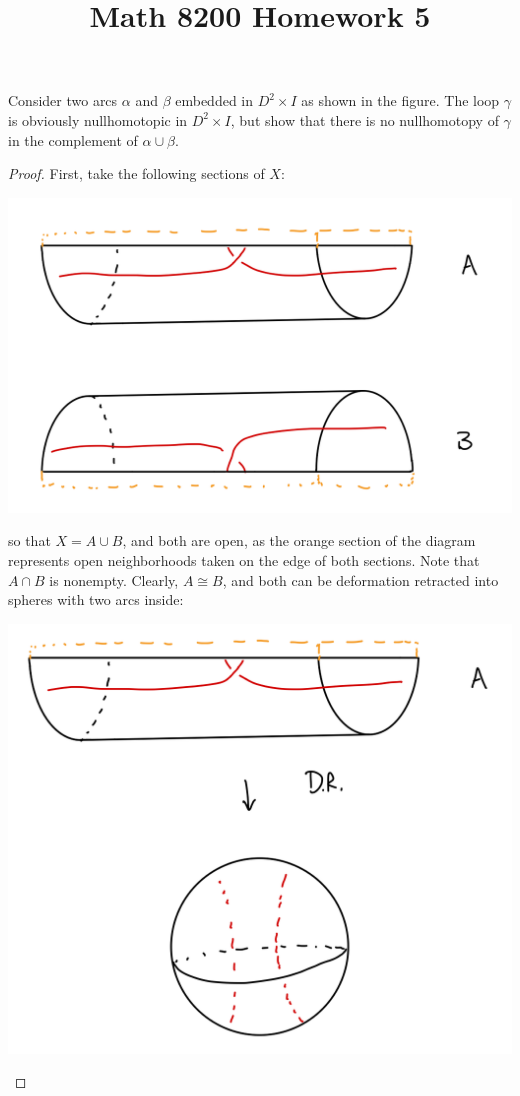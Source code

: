 \documentclass[12pt]{article}
\newenvironment{statement}[2][Statement]{\begin{trivlist}
\item[\hskip \labelsep {\bfseries #1}\hskip \labelsep {\bfseries #2.}]}{\end{trivlist}}
\begin{document}
 
\title{Math 8200 Homework 5} 
\author{} 
\maketitle

\begin{statement}[Problem]{1}
  Consider two arcs $\alpha$ and $\beta$ embedded in $D^2 \times I$ as shown in the figure. 
  The loop $\gamma$ is obviously nullhomotopic in $D^2 \times I$, but show that there is 
  no nullhomotopy of $\gamma$ in the complement of $\alpha \cup \beta$. 
\end{statement}
\begin{proof}
  First, take the following sections of $X$:
  \par \begin{center} \includegraphics[scale=.2]{1-1.png} \end{center} 
  so that $X = A \cup B$, and both are open, as the orange section of 
  the diagram represents open neighborhoods taken on the edge of both sections. Note that $A \cap B$ is nonempty. 
  Clearly, $A \cong B$, and both can be deformation retracted into spheres with two arcs inside: 
  \par \begin{center} \includegraphics[scale=.2]{1-2.png} \end{center}

\end{proof}
\end{document}
